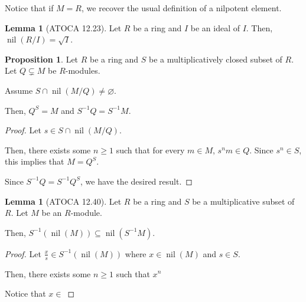 \documentclass{article}
\theoremstyle{definition}
\newtheorem{lemma}[theorem]{Lemma}
\newtheorem{proposition}[theorem]{Proposition}
\newcommand{\nil}{\operatorname{nil}}
\begin{document}
Notice that if $ M = R $, we recover the usual definition of a nilpotent element.

\begin{lemma}[ATOCA 12.23]
    Let $ R $ be a ring and $ I $ be an ideal of $ I $. Then, $ \nil(R/I) = \sqrt{I} $.
\end{lemma}

\begin{proposition}
    Let $ R $ be a ring and $ S $ be a multiplicatively closed subset of $ R $.
    Let $ Q \subsetneq M $ be $ R $-modules.

    Assume $ S \cap \nil(M/Q) \neq \varnothing $.

    Then, $ Q^{S} = M $ and $ S^{-1}Q = S^{-1}M $.
\end{proposition}
\begin{proof}
    Let $ s \in S \cap \nil(M/Q) $.

    Then, there exists some $ n \geq 1 $ such that for every $ m \in M $,
    $ s^{n}m \in Q $. Since $ s^{n} \in S $, this implies that $ M = Q^{S} $.

    Since $ S^{-1}Q = S^{-1} Q^{S} $, we have the desired result.
\end{proof}

\begin{lemma}[ATOCA 12.40]
    Let $ R $ be a ring and $ S $ be a multiplicative subset of $ R $.
    Let $ M $ be an $ R $-module.

    Then, $ S^{-1} (\nil(M)) \subseteq \nil(S^{-1}M) $.
\end{lemma}
\begin{proof}
    Let $ \frac{x}{s} \in S^{-1} (\nil(M)) $ where $ x \in \nil(M) $
    and $ s \in S $.

    Then, there exists some $ n \geq 1 $ such that $ x^{n} $

    Notice that $ x \in $
\end{proof}
\end{document}
